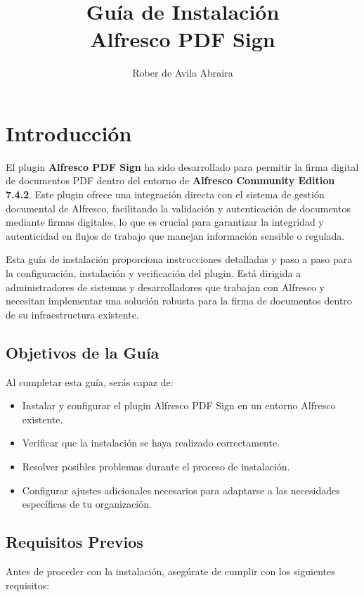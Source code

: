 \documentclass{ol-softwaremanual}
\title{Guía de Instalación \\ Alfresco PDF Sign}
\author{Rober de Avila Abraira}
\begin{document}
\maketitle

\tableofcontents
\newpage


\section{Introducción}

El plugin \textbf{Alfresco PDF Sign} ha sido desarrollado para permitir la firma digital de documentos PDF dentro del entorno de \textbf{Alfresco Community Edition 7.4.2}. Este plugin ofrece una integración directa con el sistema de gestión documental de Alfresco, facilitando la validación y autenticación de documentos mediante firmas digitales, lo que es crucial para garantizar la integridad y autenticidad en flujos de trabajo que manejan información sensible o regulada.

Esta guía de instalación proporciona instrucciones detalladas y paso a paso para la configuración, instalación y verificación del plugin. Está dirigida a administradores de sistemas y desarrolladores que trabajan con Alfresco y necesitan implementar una solución robusta para la firma de documentos dentro de su infraestructura existente.

\subsection{Objetivos de la Guía}
Al completar esta guía, serás capaz de:

\begin{itemize}
	\item Instalar y configurar el plugin Alfresco PDF Sign en un entorno Alfresco existente.
	\item Verificar que la instalación se haya realizado correctamente.
	\item Resolver posibles problemas durante el proceso de instalación.
	\item Configurar ajustes adicionales necesarios para adaptarse a las necesidades específicas de tu organización.
\end{itemize}

\subsection{Requisitos Previos}
Antes de proceder con la instalación, asegúrate de cumplir con los siguientes requisitos:
\end{document}
